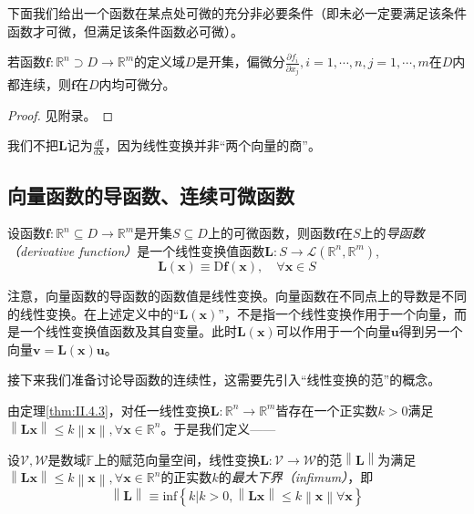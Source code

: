\documentclass[../main.tex]{subfiles}
\begin{document}
下面我们给出一个函数在某点处可微的充分非必要条件（即未必一定要满足该条件函数才可微，但满足该条件函数必可微）\cite[“例3”,p.~23]{华工高数2009下}。

\begin{theorem}\label{thm:II.4.9}
    若函数$\mathbf{f}:\mathbb{R}^n\supset D\rightarrow\mathbb{R}^m$的定义域$D$是开集，偏微分$\frac{\partial f_i}{\partial x_j},i=1,\cdots,n,j=1,\cdots,m$在$D$内都连续，则$\mathbf{f}$在$D$内均可微分。
\end{theorem}
\begin{proof}
    见附录。
\end{proof}

我们不把$\mathbf{L}$记为$\frac{d\mathbf{f}}{d\mathbf{x}}$，因为线性变换并非“两个向量的商”。

\subsection{向量函数的导函数、连续可微函数}
\begin{definition}[向量函数的导函数]\label{def:II.4.15}
    设函数$\mathbf{f}:\mathbb{R}^n\subseteq D\rightarrow\mathbb{R}^m$是开集$S\subseteq D$上的可微函数，则函数$\mathbf{f}$在$S$上的\emph{导函数（derivative function）}是一个线性变换值函数$\mathbf{L}:S\rightarrow\mathcal{L}\left(\mathbb{R}^n,\mathbb{R}^m\right)$,
    \[\mathbf{L}\left(\mathbf{x}\right)\equiv \mathrm{D}\mathbf{f}\left(\mathbf{x}\right),\quad\forall\mathbf{x}\in S\]
\end{definition}

注意，向量函数的导函数的函数值是线性变换。向量函数在不同点上的导数是不同的线性变换。在上述定义中的“$\mathbf{L}\left(\mathbf{x}\right)$”，不是指一个线性变换作用于一个向量，而是一个线性变换值函数及其自变量。此时$\mathbf{L}\left(\mathbf{x}\right)$可以作用于一个向量$\mathbf{u}$得到另一个向量$\mathbf{v}=\mathbf{L}\left(\mathbf{x}\right)\mathbf{u}$。

接下来我们准备讨论导函数的连续性，这需要先引入“线性变换的范”的概念。

由定理\ref{thm:II.4.3}，对任一线性变换$\mathbf{L}:\mathbb{R}^n\rightarrow\mathbb{R}^m$皆存在一个正实数$k>0$满足$\left\|\mathbf{Lx}\right\|\leq k\left\|\mathbf{x}\right\|,\forall\mathbf{x}\in\mathbb{R}^n$。于是我们定义——
\begin{definition}[线性变换的范]\label{def:II.4.16}
    设$\mathcal{V},\mathcal{W}$是数域$\mathbb{F}$上的赋范向量空间，线性变换$\mathbf{L}:\mathcal{V}\rightarrow\mathcal{W}$的范$\left\|\mathbf{L}\right\|$为满足$\left\|\mathbf{Lx}\right\|\leq k\left\|\mathbf{x}\right\|,\forall\mathbf{x}\in\mathbb{R}^n$的正实数$k$的\emph{最大下界（infimum）}，即
    \[\left\|\mathbf{L}\right\|\equiv\mathrm{inf}\left\{k|k>0,\left\|\mathbf{Lx}\right\|\leq k\left\|\mathbf{x}\right\|\forall\mathbf{x}\right\}\]
\end{definition}
\end{document}
